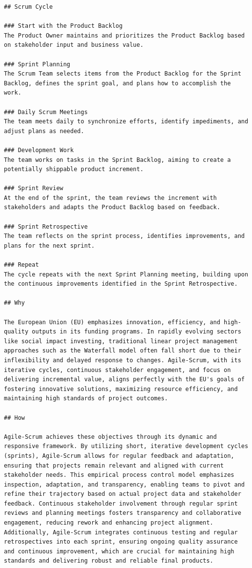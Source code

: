 \documentclass[
  letterpaper,
  DIV=11,
  numbers=noendperiod]{scrreprt}
\begin{document}
\begin{verbatim}
## Scrum Cycle

### Start with the Product Backlog
The Product Owner maintains and prioritizes the Product Backlog based on stakeholder input and business value.

### Sprint Planning
The Scrum Team selects items from the Product Backlog for the Sprint Backlog, defines the sprint goal, and plans how to accomplish the work.

### Daily Scrum Meetings
The team meets daily to synchronize efforts, identify impediments, and adjust plans as needed.

### Development Work
The team works on tasks in the Sprint Backlog, aiming to create a potentially shippable product increment.

### Sprint Review
At the end of the sprint, the team reviews the increment with stakeholders and adapts the Product Backlog based on feedback.

### Sprint Retrospective
The team reflects on the sprint process, identifies improvements, and plans for the next sprint.

### Repeat
The cycle repeats with the next Sprint Planning meeting, building upon the continuous improvements identified in the Sprint Retrospective.

## Why

The European Union (EU) emphasizes innovation, efficiency, and high-quality outputs in its funding programs. In rapidly evolving sectors like social impact investing, traditional linear project management approaches such as the Waterfall model often fall short due to their inflexibility and delayed response to changes. Agile-Scrum, with its iterative cycles, continuous stakeholder engagement, and focus on delivering incremental value, aligns perfectly with the EU's goals of fostering innovative solutions, maximizing resource efficiency, and maintaining high standards of project outcomes.

## How

Agile-Scrum achieves these objectives through its dynamic and responsive framework. By utilizing short, iterative development cycles (sprints), Agile-Scrum allows for regular feedback and adaptation, ensuring that projects remain relevant and aligned with current stakeholder needs. This empirical process control model emphasizes inspection, adaptation, and transparency, enabling teams to pivot and refine their trajectory based on actual project data and stakeholder feedback. Continuous stakeholder involvement through regular sprint reviews and planning meetings fosters transparency and collaborative engagement, reducing rework and enhancing project alignment. Additionally, Agile-Scrum integrates continuous testing and regular retrospectives into each sprint, ensuring ongoing quality assurance and continuous improvement, which are crucial for maintaining high standards and delivering robust and reliable final products.


\end{verbatim}
\end{document}
